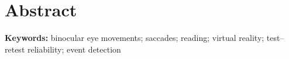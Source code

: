 \documentclass[12pt,a4paper]{article}
\title{\ManuscriptTitle}
\author{\AuthorNames\\[12pt]\parbox{0.96\textwidth}{\centering\small\AuthorDetails}}
\date{}
\begin{document}
\begin{singlespace}
\maketitle
\end{singlespace}
\thispagestyle{plain}
\clearpage
\linenumbers
\section*{Abstract}
\noindent
\par\medskip
\noindent\textbf{Keywords:} binocular eye movements; saccades; reading; virtual reality; test--retest reliability; event detection
\clearpage




\clearpage

\clearpage


\end{document}
